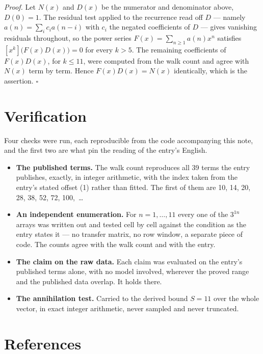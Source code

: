 \documentclass[11pt]{article}
\theoremstyle{definition}
\begin{document}
{\itshape Proof.} Let $N(x)$ and $D(x)$ be the numerator and denominator above, $D(0)=1$. The residual test applied to the recurrence read off $D$ --- namely $a(n) = \sum_i c_i a(n-i)$ with $c_i$ the negated coefficients of $D$ --- gives vanishing residuals throughout, so the power series $F(x)=\sum_{n\ge 1}a(n)x^n$ satisfies $[x^k]\bigl(F(x)D(x)\bigr) = 0$ for every $k > 5$. The remaining coefficients of $F(x)D(x)$, for $k \le 11$, were computed from the walk count and agree with $N(x)$ term by term. Hence $F(x)D(x) = N(x)$ identically, which is the assertion. $\square$

\section{Verification}

Four checks were run, each reproducible from the code accompanying this note, and the first two are what pin the reading of the entry's English.

\begin{itemize}

\item {\bfseries The published terms.} The walk count reproduces all 39 terms the entry publishes, exactly, in integer arithmetic, with the index taken from the entry's stated offset (1) rather than fitted. The first of them are 10, 14, 20, 28, 38, 52, 72, 100,~\dots

\item {\bfseries An independent enumeration.} For $n = 1,\dots,11$ every one of the $3^{1n}$ arrays was written out and tested cell by cell against the condition as the entry states it --- no transfer matrix, no row window, a separate piece of code. The counts agree with the walk count and with the entry.

\item {\bfseries The claim on the raw data.} Each claim was evaluated on the entry's published terms alone, with no model involved, wherever the proved range and the published data overlap. It holds there.

\item {\bfseries The annihilation test.} Carried to the derived bound $S = 11$ over the whole vector, in exact integer arithmetic, never sampled and never truncated.

\end{itemize}

\section{References}
\end{document}
